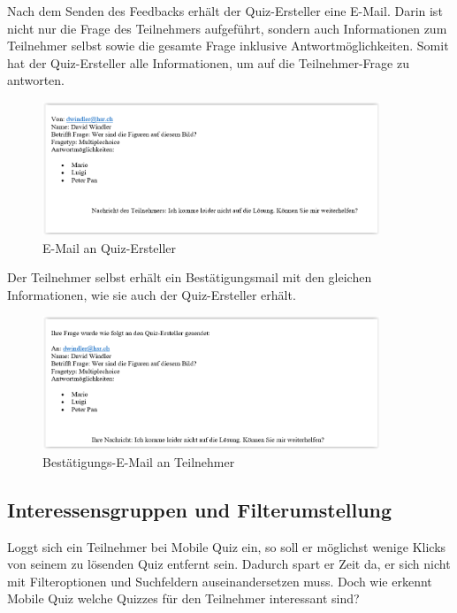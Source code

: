 Nach dem Senden des Feedbacks erhält der Quiz-Ersteller eine E-Mail. Darin ist nicht nur die Frage des Teilnehmers aufgeführt, sondern auch Informationen zum Teilnehmer selbst sowie die gesamte Frage inklusive Antwortmöglichkeiten. Somit hat der Quiz-Ersteller alle Informationen, um auf die Teilnehmer-Frage zu antworten.

\begin{figure}[H]
	\centering
	\includegraphics[width=0.9\textwidth]{Images/Feedback-Mail_Quiz-Ersteller.PNG}
	\caption{E-Mail an Quiz-Ersteller}
\end{figure}

Der Teilnehmer selbst erhält ein Bestätigungsmail mit den gleichen Informationen, wie sie auch der Quiz-Ersteller erhält.

\begin{figure}[H]
	\centering
	\includegraphics[width=0.9\textwidth]{Images/Feedback-Mail_Teilnehmer.PNG}
	\caption{Bestätigungs-E-Mail an Teilnehmer}
\end{figure}




\subsection{Interessensgruppen und Filterumstellung}
\label{InteressensgruppenUndFilterumstellung}
Loggt sich ein Teilnehmer bei Mobile Quiz ein, so soll er möglichst wenige Klicks von seinem zu lösenden Quiz entfernt sein. Dadurch spart er Zeit da, er sich nicht mit Filteroptionen und Suchfeldern auseinandersetzen muss. Doch wie erkennt Mobile Quiz welche Quizzes für den Teilnehmer interessant sind?


